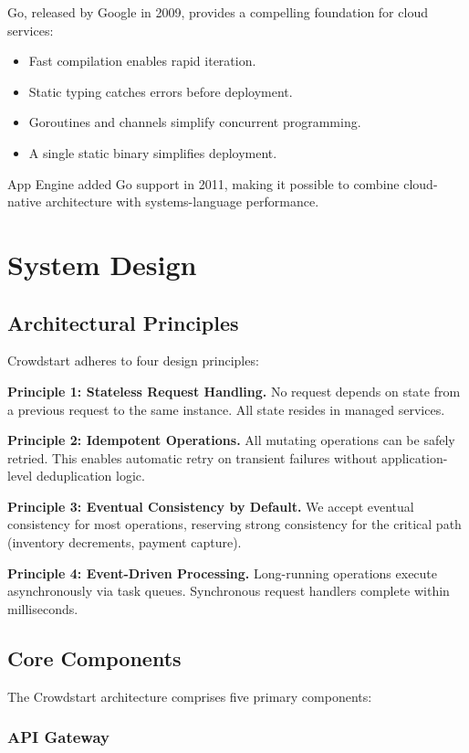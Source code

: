 \documentclass[11pt,twocolumn]{article}
\begin{document}
Go, released by Google in 2009, provides a compelling foundation for cloud services:
\begin{itemize}
\item Fast compilation enables rapid iteration.
\item Static typing catches errors before deployment.
\item Goroutines and channels simplify concurrent programming.
\item A single static binary simplifies deployment.
\end{itemize}

App Engine added Go support in 2011, making it possible to combine cloud-native architecture with systems-language performance.

\section{System Design}

\subsection{Architectural Principles}

Crowdstart adheres to four design principles:

\textbf{Principle 1: Stateless Request Handling.} No request depends on state from a previous request to the same instance. All state resides in managed services.

\textbf{Principle 2: Idempotent Operations.} All mutating operations can be safely retried. This enables automatic retry on transient failures without application-level deduplication logic.

\textbf{Principle 3: Eventual Consistency by Default.} We accept eventual consistency for most operations, reserving strong consistency for the critical path (inventory decrements, payment capture).

\textbf{Principle 4: Event-Driven Processing.} Long-running operations execute asynchronously via task queues. Synchronous request handlers complete within milliseconds.

\subsection{Core Components}

The Crowdstart architecture comprises five primary components:

\subsubsection{API Gateway}
\end{document}
